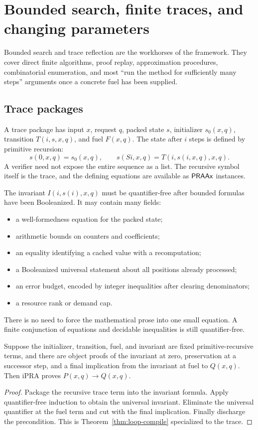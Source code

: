 \section{Bounded search, finite traces, and changing parameters}
\label{sec:traces}

Bounded search and trace reflection are the workhorses of the framework.  They cover direct finite
algorithms, proof replay, approximation procedures, combinatorial enumeration, and most ``run the method
for sufficiently many steps'' arguments once a concrete fuel has been supplied.

\subsection{Trace packages}

A trace package has input \(x\), request \(q\), packed state \(s\), initializer \(s_0(x,q)\), transition
\(T(i,s,x,q)\), and fuel \(F(x,q)\).  The state after \(i\) steps is defined by primitive recursion:
\[
 s(0,x,q)=s_0(x,q),
 \qquad
 s(Si,x,q)=T(i,s(i,x,q),x,q).
\]
A verifier need not expose the entire sequence as a list.  The recursive symbol itself is the trace, and
the defining equations are available as \(\mathsf{PRAAx}\) instances.

The invariant \(I(i,s(i),x,q)\) must be quantifier-free after bounded formulas have been Booleanized.  It
may contain many fields:
\begin{itemize}
  \item a well-formedness equation for the packed state;
  \item arithmetic bounds on counters and coefficients;
  \item an equality identifying a cached value with a recomputation;
  \item a Booleanized universal statement about all positions already processed;
  \item an error budget, encoded by integer inequalities after clearing denominators;
  \item a resource rank or demand cap.
\end{itemize}
There is no need to force the mathematical prose into one small equation.  A finite conjunction of
equations and decidable inequalities is still quantifier-free.

\begin{theorem}
\label{thm:trace-reflection}
Suppose the initializer, transition, fuel, and invariant are fixed primitive-recursive terms, and there are
object proofs of the invariant at zero, preservation at a successor step, and a final implication from the
invariant at fuel to \(Q(x,q)\).  Then iPRA proves \(P(x,q)\to Q(x,q)\).
\end{theorem}
\begin{proof}
Package the recursive trace term into the invariant formula.  Apply quantifier-free induction to obtain the
universal invariant.  Eliminate the universal quantifier at the fuel term and cut with the final implication.
Finally discharge the precondition.  This is Theorem~\ref{thm:loop-compile} specialized to the trace.
\end{proof}

